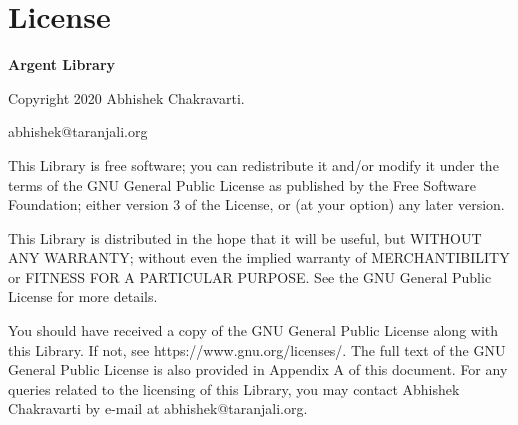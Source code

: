\chapter{License}

\begin{center}
\textbf{Argent Library} \par
Copyright \small{\textcopyright} 2020 Abhishek Chakravarti.\par
abhishek@taranjali.org
\end{center}

This Library is free software; you can redistribute it and/or modify it under 
the terms of the GNU General Public License as published by the Free Software 
Foundation; either version 3 of the License, or (at your option) any later 
version.

This Library is distributed in the hope that it will be useful, but WITHOUT ANY 
WARRANTY; without even the implied warranty of MERCHANTIBILITY or FITNESS FOR A 
PARTICULAR PURPOSE. See the GNU General Public License for more details.

You should have received a copy of the GNU General Public License along with 
this Library. If not, see https://www.gnu.org/licenses/. The full text of the
GNU General Public License is also provided in Appendix A of this document. For 
any queries related to the licensing of this Library, you may contact Abhishek 
Chakravarti by e-mail at abhishek@taranjali.org.

